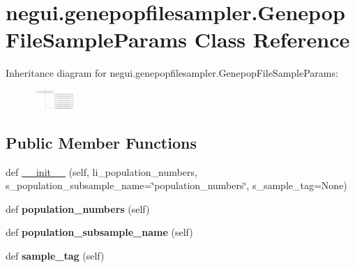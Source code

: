 \hypertarget{classnegui_1_1genepopfilesampler_1_1GenepopFileSampleParams}{}\section{negui.\+genepopfilesampler.\+Genepop\+File\+Sample\+Params Class Reference}
\label{classnegui_1_1genepopfilesampler_1_1GenepopFileSampleParams}
Inheritance diagram for negui.\+genepopfilesampler.\+Genepop\+File\+Sample\+Params\+:\begin{figure}[H]
\begin{center}
\leavevmode
\includegraphics[height=0.712695cm]{classnegui_1_1genepopfilesampler_1_1GenepopFileSampleParams}
\end{center}
\end{figure}
\subsection*{Public Member Functions}
\begin{DoxyCompactItemize}
\item 
def \hyperlink{classnegui_1_1genepopfilesampler_1_1GenepopFileSampleParams_a1731e7a334311beccf587ca3c9d2cea6}{\+\_\+\+\_\+init\+\_\+\+\_\+} (self, li\+\_\+population\+\_\+numbers, s\+\_\+population\+\_\+subsample\+\_\+name=\char`\"{}population\+\_\+numbers\char`\"{}, s\+\_\+sample\+\_\+tag=None)
\item 
def {\bfseries population\+\_\+numbers} (self)\hypertarget{classnegui_1_1genepopfilesampler_1_1GenepopFileSampleParams_a5ecc667eef35a832923e5c4ce659cfe7}{}\label{classnegui_1_1genepopfilesampler_1_1GenepopFileSampleParams_a5ecc667eef35a832923e5c4ce659cfe7}

\item 
def {\bfseries population\+\_\+subsample\+\_\+name} (self)\hypertarget{classnegui_1_1genepopfilesampler_1_1GenepopFileSampleParams_ab3ae1c545edd5230e6c37db9507d0535}{}\label{classnegui_1_1genepopfilesampler_1_1GenepopFileSampleParams_ab3ae1c545edd5230e6c37db9507d0535}

\item 
def {\bfseries sample\+\_\+tag} (self)\hypertarget{classnegui_1_1genepopfilesampler_1_1GenepopFileSampleParams_aa34487d4f6dd79d0313cf0e2038a1ef1}{}\label{classnegui_1_1genepopfilesampler_1_1GenepopFileSampleParams_aa34487d4f6dd79d0313cf0e2038a1ef1}

\end{DoxyCompactItemize}


